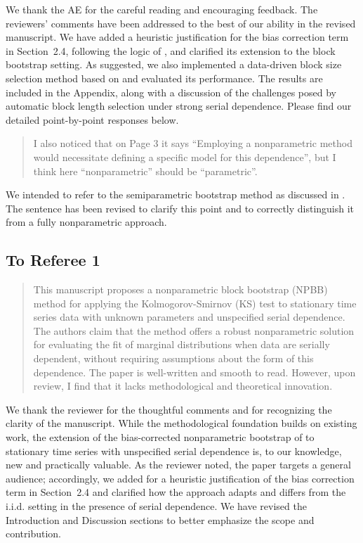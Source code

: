 \documentclass[12pt]{article}
\newenvironment{comment}%
{\begin{quotation}\noindent\small\it\color{darkblue}\ignorespaces%
}{\end{quotation}}
\begin{document}
We thank the AE for the careful reading and encouraging feedback. The
reviewers’ comments have been addressed to the best of our ability in
the revised manuscript. We have added a heuristic justification for
the bias correction term in Section~2.4, following the logic of
\citet{babu2004goodness}, and clarified its extension to the block
bootstrap setting. As suggested, we also implemented a data-driven
block size selection method based on \citet{politis2004automatic} and
evaluated its performance. The results are included in the Appendix,
along with a discussion of the challenges posed by automatic block
length selection under strong serial dependence. Please find our
detailed point-by-point responses below.

\begin{comment}
I also noticed that on Page 3 it says “Employing a nonparametric method would necessitate defining a specific model for this dependence”, but I think here “nonparametric” should be “parametric”.
\end{comment}

We intended to refer to the semiparametric bootstrap method as
discussed in \citet{zeimbekakis2024misuses}. The sentence has been
revised to clarify this point and to correctly distinguish it from a
fully nonparametric approach.


\subsection*{To Referee 1}

\begin{comment}
This manuscript proposes a nonparametric block bootstrap (NPBB) method for applying the
Kolmogorov-Smirnov (KS) test to stationary time series data with unknown parameters and unspecified serial dependence. The authors claim that the method offers a robust nonparametric solution for evaluating the fit of marginal distributions when data are serially dependent, without
requiring assumptions about the form of this dependence. The paper is well-written and smooth
to read. However, upon review, I find that it lacks methodological and theoretical innovation.
\end{comment}


We thank the reviewer for the thoughtful comments and for recognizing
the clarity of the manuscript. While the methodological foundation
builds on existing work, the extension of the bias-corrected
nonparametric bootstrap of \citet{babu2004goodness} to stationary time
series with unspecified serial dependence is, to our knowledge, new
and practically valuable. As the reviewer noted, the paper targets a
general audience; accordingly, we added for a heuristic justification
of the bias correction term in Section~2.4 and clarified how the
approach adapts and differs from the i.i.d. setting in the presence of
serial dependence. We have revised the Introduction and Discussion
sections to better emphasize the scope and contribution.
\end{document}
